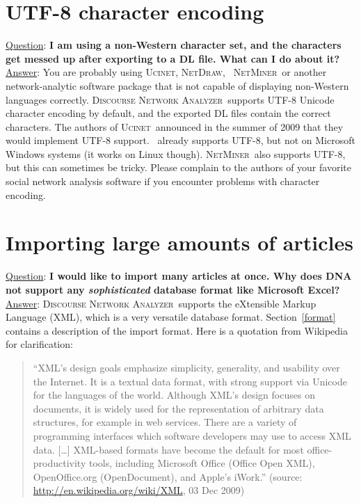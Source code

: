\documentclass[12pt,a4paper]{scrreprt}
\newcommand{\visone}
{\textsf%
 {\protect\raisebox{.5ex}{\color[rgb]{0.1,0.1,0.1}v}%
  \protect\raisebox{.1ex}{\color[rgb]{0.3,0.3,0.3}i}%
  \protect\raisebox{-.1ex}{\color[rgb]{0.1,0.1,0.1}s}%
  \protect\raisebox{.1ex}{\color[rgb]{0.3,0.3,0.3}o}%
  \protect\raisebox{-.1ex}{\color[rgb]{0.1,0.1,0.1}n}%
  \protect\raisebox{-.4ex}{\color[rgb]{0.3,0.3,0.3}e}%
 }%
}
\newcommand{\ucinet}{\textsc{Ucinet}}
\newcommand{\netdraw}{\textsc{NetDraw}}
\newcommand{\dnalong}{\textsc{Discourse} \textsc{Network} \textsc{Analyzer}}
\newcommand{\netminer}{\textsc{NetMiner}}
\begin{document}
\section{UTF-8 character encoding}
\underline{Question}: \textbf{I am using a non-Western character set, and the characters get messed up after exporting to a DL file. What can I do about it?}
\vspace{0.3cm} \newline
\underline{Answer}: You are probably using \ucinet, \netdraw, \visone\, \netminer\ or another network-analytic software package that is not capable of displaying non-Western languages correctly. \dnalong\ supports UTF-8 Unicode character encoding by default, and the exported DL files contain the correct characters. The authors of \ucinet\ announced in the summer of 2009 that they would implement UTF-8 support. \visone\ already supports UTF-8, but not on Microsoft Windows systems (it works on Linux though). \netminer\ also supports UTF-8, but this can sometimes be tricky. Please complain to the authors of your favorite social network analysis software if you encounter problems with character encoding.

\section{Importing large amounts of articles}
\underline{Question}: \textbf{I would like to import many articles at once. Why does DNA not support any \emph{sophisticated} database format like Microsoft Excel?}
\vspace{0.3cm} \newline
\underline{Answer}: \dnalong\ supports the eXtensible Markup Language (XML), which is a very versatile database format. Section~\ref{format} contains a description of the import format. Here is a quotation from Wikipedia for clarification:
\begin{quote}
 ``XML's design goals emphasize simplicity, generality, and usability over the Internet. It is a textual data format, with strong support via Unicode for the languages of the world. Although XML's design focuses on documents, it is widely used for the representation of arbitrary data structures, for example in web services. There are a variety of programming interfaces which software developers may use to access XML data. [\ldots] XML-based formats have become the default for most office-productivity tools, including Microsoft Office (Office Open XML), OpenOffice.org (OpenDocument), and Apple's iWork.'' (source: \url{http://en.wikipedia.org/wiki/XML}, 03 Dec 2009)
\end{quote}
\end{document}
